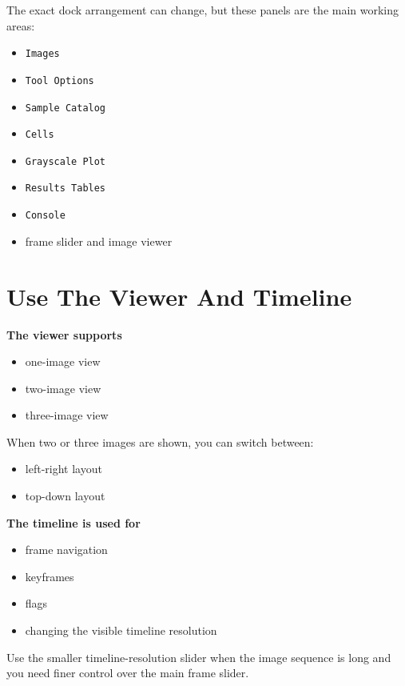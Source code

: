 \documentclass[
  9pt,
  letterpaper,
  oneside,
  open=any,
  DIV=15,
  parskip=half-,
  headings=big,
  numbers=noenddot
]{scrbook}
\newcommand{\manuallead}[1]{%
  \vspace{0.15em}%
  {\sffamily\bfseries\color{ManualBlue}#1}\par\nobreak\vspace{0.05em}%
}
\begin{document}
The exact dock arrangement can change, but these panels are the main working areas:


\begin{itemize}[leftmargin=*,itemsep=0.35em,topsep=0.4em]
\item \texttt{Images}
\item \texttt{Tool Options}
\item \texttt{Sample Catalog}
\item \texttt{Cells}
\item \texttt{Grayscale Plot}
\item \texttt{Results Tables}
\item \texttt{Console}
\item frame slider and image viewer
\end{itemize}

\section{Use The Viewer And Timeline}

\manuallead{The viewer supports}

\begin{itemize}[leftmargin=*,itemsep=0.35em,topsep=0.4em]
\item one-image view
\item two-image view
\item three-image view
\end{itemize}

When two or three images are shown, you can switch between:


\begin{itemize}[leftmargin=*,itemsep=0.35em,topsep=0.4em]
\item left-right layout
\item top-down layout
\end{itemize}

\manuallead{The timeline is used for}

\begin{itemize}[leftmargin=*,itemsep=0.35em,topsep=0.4em]
\item frame navigation
\item keyframes
\item flags
\item changing the visible timeline resolution
\end{itemize}

Use the smaller timeline-resolution slider when the image sequence is long and you need finer control over the main frame slider.
\end{document}
